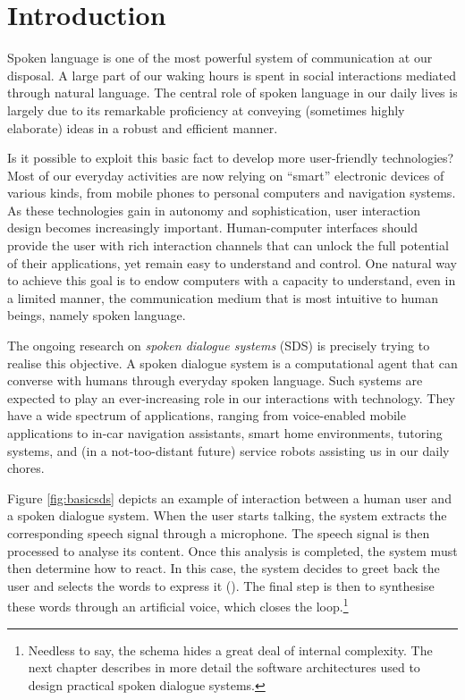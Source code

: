 
\chapter{Introduction}
\setcounter{page}{1}

Spoken language is one of the most powerful system of communication at our disposal. A large part of our waking hours is spent in social interactions mediated through natural language.  The central role of spoken language in our daily lives is largely due to its remarkable proficiency at conveying (sometimes highly elaborate) ideas in a robust and efficient manner. 

Is it possible to exploit this basic fact to develop more user-friendly technologies? Most of our everyday activities are now relying on ``smart'' electronic devices of various kinds, from mobile phones to personal computers and navigation systems. As these technologies gain in autonomy and sophistication, user interaction design becomes increasingly important. Human-computer interfaces should provide the user with rich interaction channels that can unlock the full potential of their applications, yet remain easy to understand and control.  One natural way to achieve this goal is to endow computers with a capacity to understand, even in a limited manner, the communication medium that is most intuitive to human beings, namely spoken language.  

The ongoing research on \textit{spoken dialogue systems} (SDS) is precisely trying to realise this objective. A spoken dialogue system is a computational agent that can converse with humans through everyday spoken language. Such systems are expected to play an ever-increasing role in our interactions with technology. They have a wide spectrum of applications, ranging from voice-enabled mobile applications to in-car navigation assistants, smart home environments, tutoring systems, and (in a not-too-distant future) service robots assisting us in our daily chores.

Figure \ref{fig:basicsds} depicts an example of interaction between a human user and a spoken dialogue system. When the user starts talking, the system extracts the corresponding speech signal through a microphone.  The speech signal is then processed to analyse its content.  Once this analysis is completed, the system must then determine how to react.  In this case, the system decides to greet back the user and selects the words to express it (). The final step is then to synthesise these words through an artificial voice, which closes the loop.\footnote{ Needless to say, the schema hides a great deal of internal complexity.  The next chapter describes in more detail the software architectures used to design practical spoken dialogue systems.}

